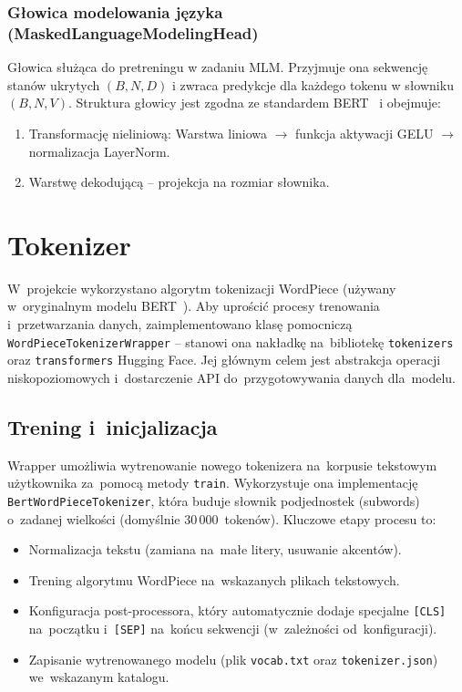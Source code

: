 \documentclass[a4paper,11pt,twoside]{report}
\theoremstyle{definition}
\begin{document}
\subsubsection{Głowica modelowania języka (MaskedLanguageModelingHead)}
Głowica służąca do pretreningu w zadaniu MLM. Przyjmuje ona sekwencję stanów ukrytych $(B, N, D)$ i zwraca predykcje dla każdego tokenu w słowniku $(B, N, V)$. Struktura głowicy jest zgodna ze standardem BERT~\cite{devlin2019bert} i obejmuje:
\begin{enumerate}
    \item Transformację nieliniową: Warstwa liniowa $\to$ funkcja aktywacji GELU $\to$ normalizacja LayerNorm.
    \item Warstwę dekodującą -- projekcja na rozmiar słownika.
\end{enumerate}



\section{Tokenizer}\label{sec:tokenizer}

W~projekcie wykorzystano algorytm tokenizacji WordPiece (używany w~oryginalnym modelu BERT~\cite{devlin2019bert}). Aby uprościć procesy trenowania i~przetwarzania danych, zaimplementowano klasę pomocniczą \texttt{WordPieceTokenizerWrapper} -- stanowi ona nakładkę na~bibliotekę \texttt{tokenizers} oraz \texttt{transformers} Hugging Face. Jej głównym celem jest abstrakcja operacji niskopoziomowych i~dostarczenie API do~przygotowywania danych dla~modelu.

\subsection{Trening i~inicjalizacja}
Wrapper umożliwia wytrenowanie nowego tokenizera na~korpusie tekstowym użytkownika za~pomocą metody \texttt{train}. Wykorzystuje ona implementację \texttt{BertWordPieceTokenizer}, która buduje słownik podjednostek (subwords) o~zadanej wielkości (domyślnie $30\,000$~tokenów).
Kluczowe etapy procesu to:
\begin{itemize}
    \item Normalizacja tekstu (zamiana na~małe litery, usuwanie akcentów).
    \item Trening algorytmu WordPiece na~wskazanych plikach tekstowych.
    \item Konfiguracja post-processora, który automatycznie dodaje specjalne \texttt{[CLS]} na~początku i~\texttt{[SEP]} na~końcu sekwencji (w~zależności od~konfiguracji).
    \item Zapisanie wytrenowanego modelu (plik \texttt{vocab.txt} oraz \texttt{tokenizer.json}) we~wskazanym katalogu.
\end{itemize}
\end{document}
